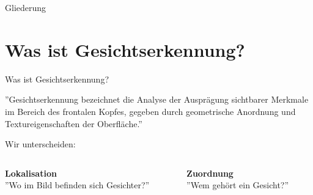 \documentclass[10pt]{beamer}
\begin{document}
\maketitle



\begin{frame}{Gliederung}
  \tableofcontents
\end{frame}

\section{Was ist Gesichtserkennung?}

\begin{frame}{Was ist Gesichtserkennung?}

  ''Gesichtserkennung bezeichnet die Analyse der Ausprägung sichtbarer Merkmale im Bereich des frontalen Kopfes, gegeben durch geometrische Anordnung und Textureigenschaften der Oberfläche.'' \cite{WikiGesichtserkennung}
  \begin{center}
    Wir unterscheiden:
  \end{center}
  \begin{columns}
    \begin{column}{.5\textwidth}
      \begin{center}
        \textbf{Lokalisation}\\
        ''Wo im Bild befinden sich Gesichter?''
      \end{center}
    \end{column}
    \begin{column}{.5\textwidth}
      \begin{center}
        \textbf{Zuordnung}\\
        ''Wem gehört ein Gesicht?''
      \end{center}
    \end{column}
  \end{columns}

\end{frame}
\end{document}
